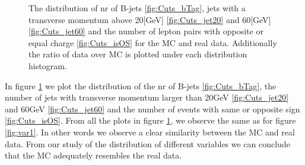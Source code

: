 \documentclass{article}
\begin{document}
\begin{figure}
    \caption{The distribution of nr of B-jets \ref{fig:Cuts_bTag}, jets with a transverse momentum above 20[GeV] \ref{fig:Cuts_jet20}  and 60[GeV] \ref{fig:Cuts_jet60} and the number of lepton pairs with opposite or equal charge \ref{fig:Cuts_isOS} for the MC and real data. Additionally the ratio of data over MC is plotted under each distribution histogram.}
    \label{fig:var2}
\end{figure}
In figure \ref{fig:var2} we plot the distribution of the nr of B-jets \ref{fig:Cuts_bTag}, the number of jets with transverse momentum larger than 20GeV \ref{fig:Cuts_jet20}
and 60GeV \ref{fig:Cuts_jet60} and the number of events with same or opposite sign \ref{fig:Cuts_isOS}. From all the plots in figure \ref{fig:var2}, we observe the same as for figure \ref{fig:var1}. In other words we observe a clear similarity between the MC and real data. From our study of the distribution of different variables we can conclude that the MC adequately resembles the real data.
\end{document}
